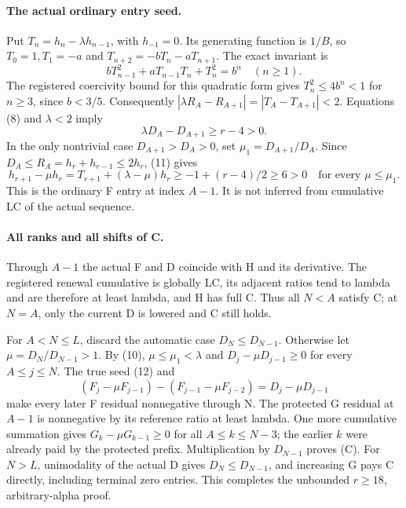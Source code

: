 \paragraph{The actual ordinary entry seed.}
Put $T_n=h_n-\lambda h_{n-1}$, with $h_{-1}=0$.
Its generating function is $1/B$, so $T_0=1,T_1=-a$ and
$T_{n+2}=-bT_n-aT_{n+1}$. The exact invariant is
\[
 bT_{n-1}^2+aT_{n-1}T_n+T_n^2=b^n\quad(n\ge1).
\]
The registered coercivity bound for this quadratic form gives
$T_n^2\le4b^n<1$ for $n\ge3$, since $b<3/5$.
Consequently $|\lambda R_A-R_{A+1}|=|T_A-T_{A+1}|<2$.
Equations (8) and $\lambda<2$ imply
\[
             \lambda D_A-D_{A+1}\ge r-4>0.         \tag{11}
\]
In the only nontrivial case $D_{A+1}>D_A>0$, set
$\mu_1=D_{A+1}/D_A$. Since
$D_A\le R_A=h_r+h_{r-1}\le2h_r$, (11) gives
\[
 h_{r+1}-\mu h_r
   =T_{r+1}+(\lambda-\mu)h_r
   \ge-1+(r-4)/2\ge6>0\quad\text{for every }\mu\le\mu_1.
                                                               \tag{12}
\]
This is the ordinary F entry at index $A-1$. It is not inferred
from cumulative LC of the actual sequence.

\paragraph{All ranks and all shifts of C.}
Through $A-1$ the actual F and D coincide with H and its derivative.
The registered renewal cumulative is globally LC, its adjacent
ratios tend to lambda and are therefore at least lambda, and H
has full C. Thus all $N<A$ satisfy C; at $N=A$, only the current
D is lowered and C still holds.

For $A<N\le L$, discard the automatic case $D_N\le D_{N-1}$.
Otherwise let $\mu=D_N/D_{N-1}>1$. By (10),
$\mu\le\mu_1<\lambda$ and $D_j-\mu D_{j-1}\ge0$
for every $A\le j\le N$. The true seed (12) and
\[
 (F_j-\mu F_{j-1})-(F_{j-1}-\mu F_{j-2})
                         =D_j-\mu D_{j-1}
\]
make every later F residual nonnegative through N. The protected
G residual at $A-1$ is nonnegative by its reference ratio at least
lambda. One more cumulative summation gives
$G_k-\mu G_{k-1}\ge0$ for all $A\le k\le N-3$;
the earlier $k$ were already paid by the protected prefix.
Multiplication by $D_{N-1}$ proves (C). For $N>L$, unimodality
of the actual D gives $D_N\le D_{N-1}$, and increasing G pays C
directly, including terminal zero entries. This completes the
unbounded $r\ge18$, arbitrary-alpha proof.

